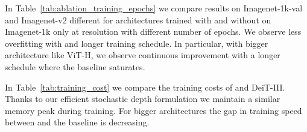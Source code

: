  
In Table~\ref{tab:ablation_training_epochs} we compare results on Imagenet-1k-val and Imagenet-v2 different for architectures trained with and without \ours on Imagenet-1k only at resolution  with different number of epochs.
We observe less overfitting with \ours and longer training schedule. In particular, with bigger architecture like ViT-H, we observe  continuous improvement with a longer schedule where the baseline saturates.

In Table~\ref{tab:training_cost} we compare the training costs of \ours and DeiT-III. 
Thanks to our efficient stochastic depth formulation we maintain a similar memory peak during  training. 
For  bigger architectures the gap in training speed between \ours and the baseline is decreasing.

\begin{table}
    \centering
    \vspace{-0.7em}
    \caption{Training times of different models trained at resolution  with batch size 2048 on Imagenet-1k with DeiT-III and our approach. 
    \ours uses our efficient stochastic depth (ESD), which amortizes the extra memory needed by \ours, especially for the largest models with  high stochastic depth values (0.45 for ViT-L, and 0.6 for ViT-H). 
    Timings are indicative and not representative of an optimized selection of the batch size. 
    \label{tab:training_cost}}
        \vspace{-0.5em}
\end{table}



